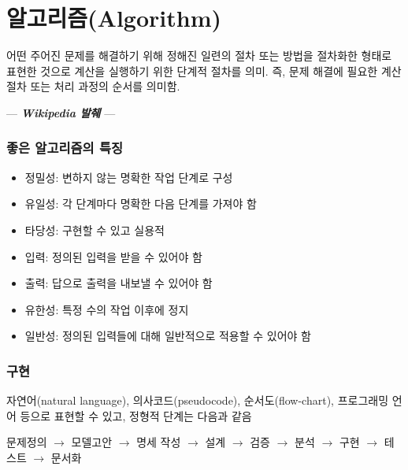 \documentclass[
  11pt,
]{krantz}
\makeatletter
\providecommand{\tightlist}{%
  \setlength{\itemsep}{0pt}\setlength{\parskip}{0pt}}
\newenvironment{kframe}{%
\medskip{}
\setlength{\fboxsep}{.8em}
 \def\at@end@of@kframe{}%
 \ifinner\ifhmode%
  \def\at@end@of@kframe{\end{minipage}}%
  \begin{minipage}{\columnwidth}%
 \fi\fi%
 \def\FrameCommand##1{\hskip\@totalleftmargin \hskip-\fboxsep
 \colorbox{shadecolor}{##1}\hskip-\fboxsep
     \hskip-\linewidth \hskip-\@totalleftmargin \hskip\columnwidth}%
 \MakeFramed {\advance\hsize-\width
   \@totalleftmargin\z@ \linewidth\hsize
   \@setminipage}}%
 {\par\unskip\endMakeFramed%
 \at@end@of@kframe}
\newenvironment{rmdblock}[1]
  {
  \begin{itemize}
  \renewcommand{\labelitemi}{
    \raisebox{-.7\height}[0pt][0pt]{
      {\setkeys{Gin}{width=3em,keepaspectratio}\texttt{[image: images/\#1]}}
    }
  }
  \setlength{\fboxsep}{1em}
  \begin{kframe}
  \item
  }
  {
  \end{kframe}
  \end{itemize}
  }
\newenvironment{rmdnote}
  {\begin{rmdblock}{note}}
  {\end{rmdblock}}
\makeatother
\begin{document}
\hypertarget{uxc54cuxace0uxb9acuxc998algorithm}{%
\section{알고리즘(Algorithm)}\label{uxc54cuxace0uxb9acuxc998algorithm}}

\footnotesize

\begin{rmdnote}
어떤 주어진 문제를 해결하기 위해 정해진 일련의 절차 또는 방법을 절차화한 형태로 표현한 것으로
계산을 실행하기 위한 단계적 절차를 의미. 즉, 문제 해결에 필요한 계산 절차 또는 처리 과정의 순서를 의미함.

--- \emph{\textbf{Wikipedia 발췌}} ---
\end{rmdnote}

\normalsize

\hypertarget{uxc88buxc740-uxc54cuxace0uxb9acuxc998uxc758-uxd2b9uxc9d5}{%
\subsubsection*{좋은 알고리즘의 특징}\label{uxc88buxc740-uxc54cuxace0uxb9acuxc998uxc758-uxd2b9uxc9d5}}


\begin{itemize}
\tightlist
\item
  정밀성: 변하지 않는 명확한 작업 단계로 구성
\item
  유일성: 각 단계마다 명확한 다음 단계를 가져야 함
\item
  타당성: 구현할 수 있고 실용적
\item
  입력: 정의된 입력을 받을 수 있어야 함
\item
  출력: 답으로 출력을 내보낼 수 있어야 함
\item
  유한성: 특정 수의 작업 이후에 정지
\item
  일반성: 정의된 입력들에 대해 일반적으로 적용할 수 있어야 함
\end{itemize}

\hypertarget{uxad6cuxd604}{%
\subsubsection*{구현}\label{uxad6cuxd604}}


자연어(natural language), 의사코드(pseudocode), 순서도(flow-chart), 프로그래밍 언어 등으로
표현할 수 있고, 정형적 단계는 다음과 같음

문제정의 \(\rightarrow\) 모델고안 \(\rightarrow\) 명세 작성 \(\rightarrow\) 설계 \(\rightarrow\)
검증 \(\rightarrow\) 분석 \(\rightarrow\) 구현 \(\rightarrow\) 테스트 \(\rightarrow\) 문서화
\end{document}
